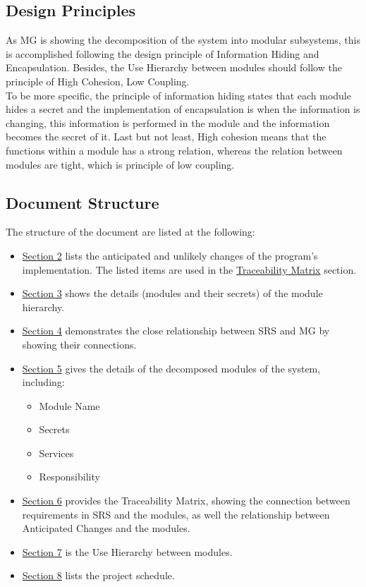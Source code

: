 \documentclass[12pt, titlepage]{article}
\begin{document}
\subsection{Design Principles}
As MG is showing the decomposition of the system into modular subsystems, this is accomplished following the design principle of Information Hiding and Encapsulation. Besides, the Use Hierarchy between modules should follow the principle of High Cohesion, Low Coupling.\\

\noindent To be more specific, the principle of information hiding states that each module hides a secret and the implementation of encapsulation is when the information is changing, this information is performed in the module and the information becomes the secret of it. Last but not least, High cohesion means that the functions within a module has a strong relation, whereas the relation between modules are tight, which is principle of low coupling.


\subsection{Document Structure}
The structure of the document are listed at the following:
\begin{itemize}
    \item \hyperref[SecChange]{Section 2} lists the anticipated and unlikely changes of the program's implementation. The listed items are used in the \hyperref[SecTM]{Traceability Matrix} section.
    \item \hyperref[SecMH]{Section 3} shows the details (modules and their secrets) of the module hierarchy.
    \item \hyperref[SecConnection]{Section 4} demonstrates the close relationship between SRS and MG by showing their connections.
    \item \hyperref[SecMD]{Section 5} gives the details of the decomposed modules of the system, including:
    \begin{itemize}
        \item Module Name
        \item Secrets
        \item Services
        \item Responsibility
    \end{itemize}
    \item \hyperref[SecTM]{Section 6} provides the Traceability Matrix, showing the connection between requirements in SRS and the modules, as well the relationship between Anticipated Changes and the modules.
    \item \hyperref[SecUse]{Section 7} is the Use Hierarchy between modules.
    \item \hyperref[SecPS]{Section 8} lists the project schedule.
\end{itemize}
\end{document}
